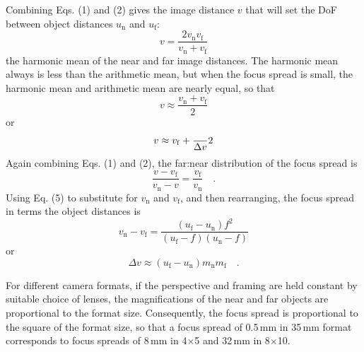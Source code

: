 \documentclass[11pt, oneside]{scrartcl}   	%
\newcommand{\Dv}{\ensuremath{\Delta v}}
\begin{document}
Combining Eqs. (1) and (2) gives the image distance $v$ that will set
the DoF between object distances $u_\mathrm{n}$ and $u_\mathrm{f}$:
\begin{equation}
  \label{eq:v}
  v =  \frac{2v_\mathrm{n}v_\mathrm{f}}{v_\mathrm{n}+v_\mathrm{f}}
\end{equation}
the harmonic mean of the near and far image distances. The harmonic mean always is less than the arithmetic mean, but when the focus spread is small, the harmonic mean and arithmetic mean are nearly equal, so that
\begin{equation}
  \label{eq:vapprox1}
  v\approx\frac{v_\mathrm{n}+v_\mathrm{f}}2
\end{equation}
or
\begin{equation}
  \label{eq:vapprox2}
  v \approx v_\mathrm{f} + \frac \Dv 2
\end{equation}
Again combining Eqs. (1) and (2), the far:near distribution of the focus spread is
\begin{equation}
   \frac{v-v_\mathrm{f}}{v_\mathrm{n}-v} = \frac{v_\mathrm{f}}{v_\mathrm{n}}\quad.
   \label{eq:33}
\end{equation}
Using Eq. (5) to substitute for $v_\mathrm{n}$ and $v_\mathrm{f}$, and then rearranging, the focus spread in terms   the object distances is
\begin{equation}
   v_\mathrm{n}-v_\mathrm{f} = \frac{(u_\mathrm{f}-u_\mathrm{n})f^2}{(u_\mathrm{f}-f)(u_\mathrm{n}-f)}
\end{equation}
or
\begin{equation}
   \Dv \approx (u_\mathrm{f} - u_\mathrm{n})m_\mathrm{n}m_\mathrm{f} \quad.
   \label{eq:34}
\end{equation}

For different camera formats, if the perspective and framing are held constant by suitable choice of lenses, the magnifications of the near and far objects are proportional to the format size. Consequently, the focus spread is proportional to the square of the format size, so that a focus spread of 0.5\,mm in 35\,mm format corresponds to focus spreads of 8\,mm in 4$\times$5 and 32\,mm in 8$\times$10.
\end{document}
